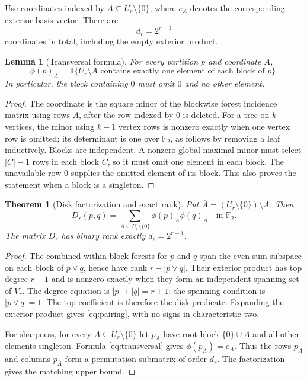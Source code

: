 \documentclass[11pt,a4paper]{article}
\newtheorem{theorem}{Theorem}[section]
\newtheorem{lemma}[lemma]{Lemma}
\theoremstyle{definition}
\newcommand{\F}{\mathbb F_2}
\newcommand{\ind}[1]{\mathbf 1\{#1\}}
\begin{document}
Use coordinates indexed by $A\subseteq U_r\setminus\{0\}$, where $e_A$ denotes the corresponding exterior basis vector. There are
\[
d_r=2^{r-1}
\]
coordinates in total, including the empty exterior product.

\begin{lemma}[Transversal formula]\label{lem:transversal}
For every partition $p$ and coordinate $A$,
\begin{equation}
\phi(p)_A=\ind{U_r\setminus A\text{ contains exactly one element of each block of }p}.
\label{eq:transversal}
\end{equation}
In particular, the block containing $0$ must omit $0$ and no other element.
\end{lemma}
\begin{proof}
The coordinate is the square minor of the blockwise forest incidence matrix using rows $A$, after the row indexed by $0$ is deleted. For a tree on $k$ vertices, the minor using $k-1$ vertex rows is nonzero exactly when one vertex row is omitted; its determinant is one over $\F$, as follows by removing a leaf inductively. Blocks are independent. A nonzero global maximal minor must select $|C|-1$ rows in each block $C$, so it must omit one element in each block. The unavailable row $0$ supplies the omitted element of its block. This also proves the statement when a block is a singleton.
\end{proof}

\begin{theorem}[Disk factorization and exact rank]\label{thm:rank}
Put $\overline A=(U_r\setminus\{0\})\setminus A$. Then
\begin{equation}
D_r(p,q)=\sum_{A\subseteq U_r\setminus\{0\}}\phi(p)_A\phi(q)_{\overline A}
\quad\text{in }\F.
\label{eq:pairing}
\end{equation}
The matrix $D_r$ has binary rank exactly $d_r=2^{r-1}$.
\end{theorem}
\begin{proof}
The combined within-block forests for $p$ and $q$ span the even-sum subspace on each block of $p\vee q$, hence have rank $r-|p\vee q|$. Their exterior product has top degree $r-1$ and is nonzero exactly when they form an independent spanning set of $V_r$. The degree equation is $|p|+|q|=r+1$; the spanning condition is $|p\vee q|=1$. The top coefficient is therefore the disk predicate. Expanding the exterior product gives \eqref{eq:pairing}, with no signs in characteristic two.

For sharpness, for every $A\subseteq U_r\setminus\{0\}$ let $p_A$ have root block $\{0\}\cup A$ and all other elements singleton. Formula \eqref{eq:transversal} gives $\phi(p_A)=e_A$. Thus the rows $p_A$ and columns $p_{\overline A}$ form a permutation submatrix of order $d_r$. The factorization gives the matching upper bound.
\end{proof}
\end{document}
